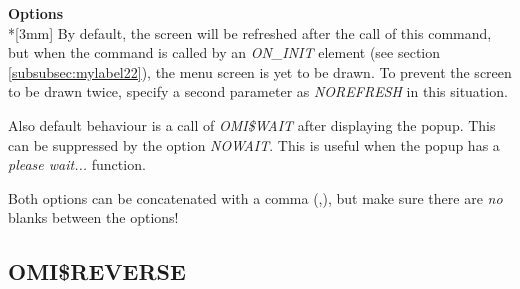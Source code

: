 \documentclass[a4paper]{book}
\begin{document}
\textbf{Options}\\*[3mm]
By default, the screen will be refreshed 
after the call of this command, but when the command is called by an 
\textsl{ON{\_}INIT} element (see section \ref{subsubsec:mylabel22}), the menu 
screen is yet to be drawn. To prevent the screen to be drawn twice, specify 
a second parameter as \textsl{NOREFRESH} in this situation.

Also default behaviour is a call of \textsl{OMI{\$}WAIT} after displaying
the popup. This can be suppressed by the option \textsl{NOWAIT}. This is useful
when the popup has a \textit{please wait...} function.

Both options can be concatenated with a comma (,), but make sure there are \textit{no}
blanks between the options!

\subsection{OMI{\$}REVERSE}
\label{subsubsec:mylabel60}
\end{document}
